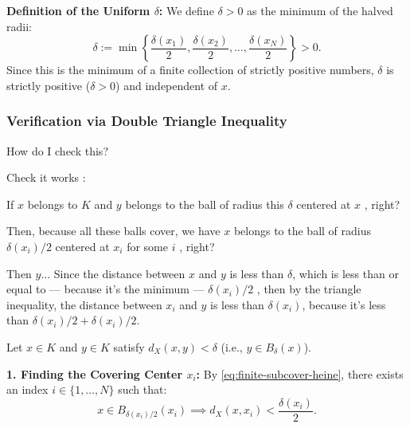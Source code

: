\begin{proofWrapper}
\begin{content}
\textbf{Definition of the Uniform $\delta$:}
We define $\delta > 0$ as the minimum of the halved radii:
\begin{equation}\label{eq:delta-min-def}
\delta := \min \left\{ \frac{\delta(x_1)}{2}, \frac{\delta(x_2)}{2}, \dots, \frac{\delta(x_N)}{2} \right\} > 0.
\end{equation}
Since this is the minimum of a finite collection of strictly positive numbers, $\delta$ is strictly positive ($\delta > 0$) and independent of $x$.
\end{content}

\subsubsection{Verification via Double Triangle Inequality}

\begin{speech}[01:20:08 - 01:22:10]
How do I check this?

Check it works :

If $x$ belongs to $K$ and $y$ belongs to the ball of radius this $\delta$ centered at $x$ , right?

Then, because all these balls cover, we have $x$ belongs to the ball of radius $\delta(x_i)/2$ centered at $x_i$ for some $i$ , right?

Then $y$... Since the distance between $x$ and $y$  is less than $\delta$, which is less than or equal to --- because it's the minimum --- $\delta(x_i)/2$ , then by the triangle inequality, the distance between $x_i$ and $y$  is less than $\delta(x_i)$, because it's less than $\delta(x_i)/2 + \delta(x_i)/2$.
\end{speech}

\begin{content}
Let $x \in K$ and $y \in K$ satisfy $d_X(x, y) < \delta$ (i.e., $y \in B_\delta(x)$).

\textbf{1. Finding the Covering Center $x_i$:}
By \eqref{eq:finite-subcover-heine}, there exists an index $i \in \{1, \dots, N\}$ such that:
\begin{equation}\label{eq:x-in-half-ball}
x \in B_{\delta(x_i)/2}(x_i) \implies d_X(x, x_i) < \frac{\delta(x_i)}{2}.
\end{equation}


\end{content}
\end{proofWrapper}
